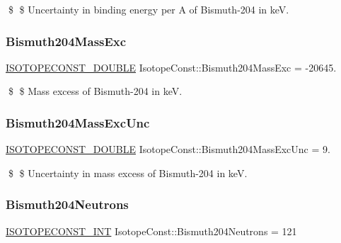 \$ \$ Uncertainty in binding energy per A of Bismuth-\/204 in keV. \mbox{\label{group___isotope_const-_bismuth-_bi204_gaed3a92d571b224f9a07a937c7caf36c3}} 
\subsubsection{\texorpdfstring{Bismuth204\+Mass\+Exc}{Bismuth204MassExc}}
{\footnotesize\ttfamily \mbox{\hyperlink{group___isotope_const-_macros_ga8f45a7272ce02c0b4c65c44636ed719a}{I\+S\+O\+T\+O\+P\+E\+C\+O\+N\+S\+T\+\_\+\+D\+O\+U\+B\+LE}} Isotope\+Const\+::\+Bismuth204\+Mass\+Exc = -\/20645.}

\$ \$ Mass excess of Bismuth-\/204 in keV. \mbox{\label{group___isotope_const-_bismuth-_bi204_ga2ac5de5134d9f8c9a78eeec13869d778}} 
\subsubsection{\texorpdfstring{Bismuth204\+Mass\+Exc\+Unc}{Bismuth204MassExcUnc}}
{\footnotesize\ttfamily \mbox{\hyperlink{group___isotope_const-_macros_ga8f45a7272ce02c0b4c65c44636ed719a}{I\+S\+O\+T\+O\+P\+E\+C\+O\+N\+S\+T\+\_\+\+D\+O\+U\+B\+LE}} Isotope\+Const\+::\+Bismuth204\+Mass\+Exc\+Unc = 9.}

\$ \$ Uncertainty in mass excess of Bismuth-\/204 in keV. \mbox{\label{group___isotope_const-_bismuth-_bi204_gae39d64a2a072640318040183e3199823}} 
\subsubsection{\texorpdfstring{Bismuth204\+Neutrons}{Bismuth204Neutrons}}
{\footnotesize\ttfamily \mbox{\hyperlink{group___isotope_const-_macros_ga5f18360b3e99483a35c32d789e62621c}{I\+S\+O\+T\+O\+P\+E\+C\+O\+N\+S\+T\+\_\+\+I\+NT}} Isotope\+Const\+::\+Bismuth204\+Neutrons = 121}

